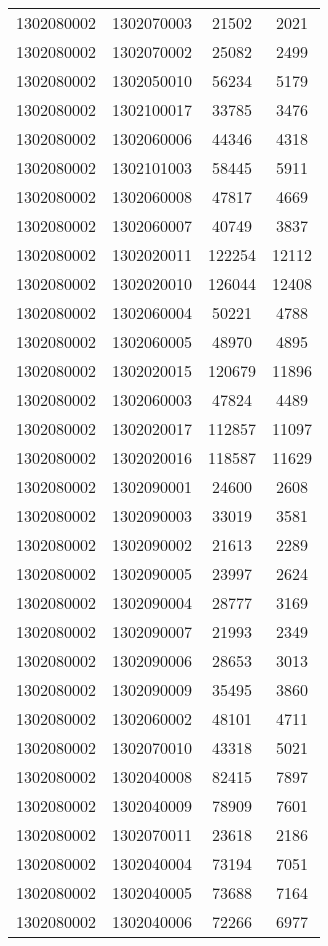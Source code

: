 \begin{longtable}[h]{llcc}
		1302080002 & 1302070003 & 21502 & 2021\\
		1302080002 & 1302070002 & 25082 & 2499\\
		1302080002 & 1302050010 & 56234 & 5179\\
		1302080002 & 1302100017 & 33785 & 3476\\
		1302080002 & 1302060006 & 44346 & 4318\\
		1302080002 & 1302101003 & 58445 & 5911\\
		1302080002 & 1302060008 & 47817 & 4669\\
		1302080002 & 1302060007 & 40749 & 3837\\
		1302080002 & 1302020011 & 122254 & 12112\\
		1302080002 & 1302020010 & 126044 & 12408\\
		1302080002 & 1302060004 & 50221 & 4788\\
		1302080002 & 1302060005 & 48970 & 4895\\
		1302080002 & 1302020015 & 120679 & 11896\\
		1302080002 & 1302060003 & 47824 & 4489\\
		1302080002 & 1302020017 & 112857 & 11097\\
		1302080002 & 1302020016 & 118587 & 11629\\
		1302080002 & 1302090001 & 24600 & 2608\\
		1302080002 & 1302090003 & 33019 & 3581\\
		1302080002 & 1302090002 & 21613 & 2289\\
		1302080002 & 1302090005 & 23997 & 2624\\
		1302080002 & 1302090004 & 28777 & 3169\\
		1302080002 & 1302090007 & 21993 & 2349\\
		1302080002 & 1302090006 & 28653 & 3013\\
		1302080002 & 1302090009 & 35495 & 3860\\
		1302080002 & 1302060002 & 48101 & 4711\\
		1302080002 & 1302070010 & 43318 & 5021\\
		1302080002 & 1302040008 & 82415 & 7897\\
		1302080002 & 1302040009 & 78909 & 7601\\
		1302080002 & 1302070011 & 23618 & 2186\\
		1302080002 & 1302040004 & 73194 & 7051\\
		1302080002 & 1302040005 & 73688 & 7164\\
		1302080002 & 1302040006 & 72266 & 6977\\

\end{longtable}
